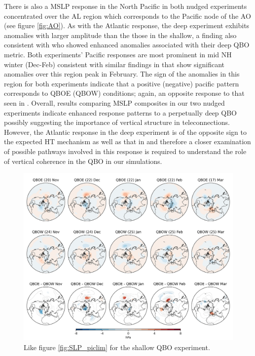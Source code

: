 There is also a MSLP response in the North Pacific in both nudged experiments concentrated over the AL region which corresponds to the Pacific node of the AO (see figure \ref{fig:AO}). As with the Atlantic response, the deep experiment exhibits anomalies with larger amplitude than the those in the shallow, a finding also consistent with \cite{andrewsObserved2019d} who showed enhanced anomalies associated with their deep QBO metric. Both experiments' Pacific responses are most prominent in mid NH winter (Dec-Feb) consistent with similar findings in \cite{graySurface2018b} that show significant anomalies over this region peak in February. The sign of the anomalies in this region for both experiments indicate that a positive (negative) pacific pattern corresponds to QBOE (QBOW) conditions; again, an opposite response to that seen in \citep{andrewsObserved2019d}. Overall, results comparing MSLP composites in our two nudged experiments indicate enhanced response patterns to a perpetually deep QBO possibly suggesting the importance of vertical structure in teleconnections. However, the Atlantic response in the deep experiment is of the opposite sign to the expected HT mechanism as well as that in \citep{andrewsObserved2019d} and therefore a closer examination of possible pathways involved in this response is required to understand the role of vertical coherence in the QBO in our simulations.

\begin{figure}[h!]
\begin{center}
\noindent\includegraphics[width =0.8\linewidth]{Figures/Figures-deepQBO/SLP_composites_individual_months_QBO_phases_U_s_50hPa_5thresh.png}
\caption[MSLP composites under different QBO phases in the shallow QBO simulation]{Like figure \ref{fig:SLP_piclim} for the shallow QBO experiment.}
\label{fig:SLP_shallow}
\end{center}
\end{figure}
\newpage

